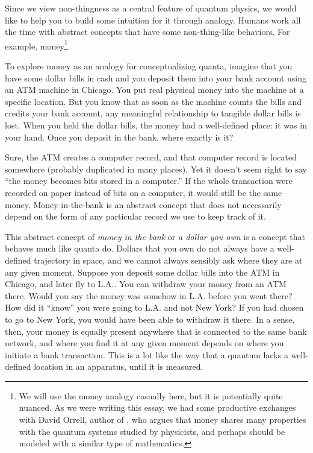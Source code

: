\documentclass[onecolumn,preprintnumbers,amsmath,amssymbn,reprint,nofootinbib,superscriptaddress]{revtex4}    %
\begin{document}
Since we view non-thingness as a central feature of quantum physics, we would like to help you to build some intuition for it through analogy.  Humans work all the time with abstract concepts that have some non-thing-like behaviors. For example, money\footnote{We will use the money analogy casually here, but it is potentially quite nuanced. As we were writing this essay, we had some productive exchanges with David Orrell, author of \cite{orrell}, who argues that money shares many properties with the quantum systems studied by physicists, and perhaps should be modeled with a similar type of mathematics.}.

To explore money as an analogy for conceptualizing quanta, imagine that you have some dollar bills in cash and you deposit them into your bank account using an ATM machine in Chicago.  You put real physical money into the machine at a specific location.  But you know that as soon as the machine counts the bills and credits your bank account, any meaningful relationship to tangible dollar bills is lost.  When you held the dollar bills, the money had a well-defined place:  it was in your hand.  Once you deposit in the bank, where exactly is it?

Sure, the ATM creates a computer record, and that computer record is located somewhere (probably duplicated in many places).  Yet it doesn't seem right to say ``the money becomes bits stored in a computer.''  If the whole transaction were recorded on paper instead of bits on a computer, it would still be the same money.  Money-in-the-bank is an abstract concept that does not necessarily depend on the form of any particular record we use to keep track of it.  

This abstract concept of {\em money in the bank} or {\em a dollar you own} is a concept that behaves much like quanta do.  Dollars that you own do not always have a well-defined trajectory in space, and we cannot always sensibly ask where they are at any given moment.  Suppose you deposit some dollar bills into the ATM in Chicago, and later fly to L.A..  You can withdraw your money from an ATM there.  Would you say the money was somehow in L.A. before you went there?  How did it ``know'' you were going to L.A. and not New York?  If you had chosen to go to New York, you would have been able to withdraw it there.  In a sense, then, your money is equally present anywhere that is connected to the same bank network, and where you find it at any given moment depends on where you initiate a bank transaction.  This is a lot like the way that a quantum lacks a well-defined location in an apparatus, until it is measured.  
\end{document}
